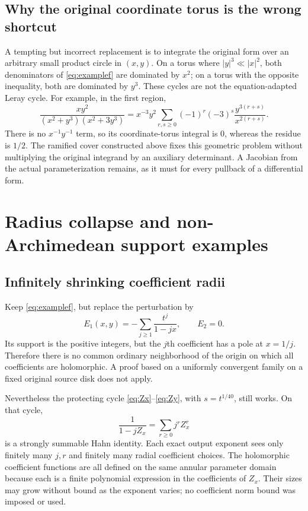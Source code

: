 \documentclass[11pt,letterpaper]{article}
\theoremstyle{definition}
\theoremstyle{remark}
\numberwithin{equation}{section}
\begin{document}
\subsection{Why the original coordinate torus is the wrong shortcut}
A tempting but incorrect replacement is to integrate the original form over
an arbitrary small product circle in $(x,y)$. On a torus where
$|y|^3\ll |x|^2$, both denominators of \eqref{eq:examplef} are dominated
by $x^2$; on a torus with the opposite inequality, both are dominated by
$y^3$. These cycles are not the equation-adapted Leray cycle.
For example, in the first region,
\[
 \frac{xy^2}{(x^2+y^3)(x^2+3y^3)}
 =x^{-3}y^2\sum_{r,s\geq0}(-1)^r(-3)^s
    \frac{y^{3(r+s)}}{x^{2(r+s)}}.
\]
There is no $x^{-1}y^{-1}$ term, so its coordinate-torus integral is $0$,
whereas the residue is $1/2$. The ramified cover constructed above fixes
this geometric problem without multiplying the original integrand by an
auxiliary determinant. A Jacobian from the actual parameterization remains,
as it must for every pullback of a differential form.

\section{Radius collapse and non-Archimedean support examples}
\label{sec:pathologies}

\subsection{Infinitely shrinking coefficient radii}
Keep \eqref{eq:examplef}, but replace the perturbation by
\begin{equation}\label{eq:radiuscollapse}
 E_1(x,y)=-\sum_{j\geq1}\frac{t^j}{1-jx},\qquad E_2=0.
\end{equation}
Its support is the positive integers, but the $j$th coefficient has a pole at
$x=1/j$. Therefore there is no common ordinary neighborhood of the origin
on which all coefficients are holomorphic. A proof based on a uniformly
convergent family on a fixed original source disk does not apply.

Nevertheless the protecting cycle \eqref{eq:Zx}--\eqref{eq:Zy}, with
$s=t^{1/40}$, still works. On that cycle,
\[
 \frac{1}{1-jZ_x}=\sum_{r\geq0}j^r Z_x^r
\]
is a strongly summable Hahn identity. Each exact output exponent sees only
finitely many $j,r$ and finitely many radial coefficient choices. The
holomorphic coefficient functions are all defined on the same annular
parameter domain because each is a finite polynomial expression in the
coefficients of $Z_x$. Their sizes may grow without bound as the exponent
varies; no coefficient norm bound was imposed or used.
\end{document}
